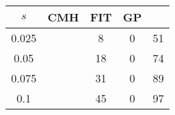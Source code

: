 \centering \begin{tabular}{c|c|c|c|c}
$s$	&CMH	&FIT	&GP	&\sc{Clear}\\\hline
0.025	&	&8	&0	&51\\
0.05	&	&18	&0	&74\\
0.075	&	&31	&0	&89\\
0.1	&	&45	&0	&97\\
\end{tabular}
